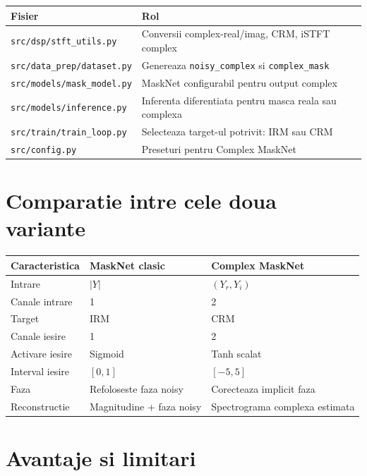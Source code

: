 \documentclass[12pt,a4paper]{article}
\begin{document}
\begin{center}
\begin{tabular}{ll}
\toprule
Fisier & Rol \\
\midrule
\texttt{src/dsp/stft\_utils.py} & Conversii complex-real/imag, CRM, iSTFT complex \\
\texttt{src/data\_prep/dataset.py} & Genereaza \texttt{noisy\_complex} si \texttt{complex\_mask} \\
\texttt{src/models/mask\_model.py} & MaskNet configurabil pentru output complex \\
\texttt{src/models/inference.py} & Inferenta diferentiata pentru masca reala sau complexa \\
\texttt{src/train/train\_loop.py} & Selecteaza target-ul potrivit: IRM sau CRM \\
\texttt{src/config.py} & Preseturi pentru Complex MaskNet \\
\bottomrule
\end{tabular}
\end{center}

\section{Comparatie intre cele doua variante}

\begin{center}
\begin{tabular}{lll}
\toprule
Caracteristica & MaskNet clasic & Complex MaskNet \\
\midrule
Intrare & $|Y|$ & $(Y_r, Y_i)$ \\
Canale intrare & 1 & 2 \\
Target & IRM & CRM \\
Canale iesire & 1 & 2 \\
Activare iesire & Sigmoid & Tanh scalat \\
Interval iesire & $[0,1]$ & $[-5,5]$ \\
Faza & Refoloseste faza noisy & Corecteaza implicit faza \\
Reconstructie & Magnitudine + faza noisy & Spectrograma complexa estimata \\
\bottomrule
\end{tabular}
\end{center}

\section{Avantaje si limitari}
\end{document}
